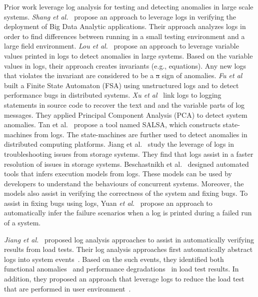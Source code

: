\documentclass[conference]{IEEEtran}
\providecommand{\DIFdel}[1]{{\protect\color{red}\sout{#1}}}                      %
\providecommand{\DIFdelbegin}{} %
\providecommand{\DIFdelend}{} %
\begin{document}
Prior work leverage log analysis for testing and detecting anomalies in large scale systems. \textsl{Shang et al.}~\cite{IanContextinformation} propose an approach to leverage logs in verifying the deployment of Big Data Analytic applications. Their approach analyzes logs in order to find differences between running in a small testing environment and a large field environment. \textsl{Lou et al.}~\cite{JGLouMining} propose an approach to leverage variable values printed in logs to detect anomalies in large systems. Based on the variable values in logs, their approach creates invariants (e.g., equations). Any new logs that violates the invariant are considered to be a \DIFdelbegin \DIFdel{a }\DIFdelend sign of anomalies. \textsl{Fu et al}~\cite{QFuanomaly} built a Finite State Automaton (FSA) using unstructured logs and to detect performance bugs in distributed systems. 
\textsl{Xu et al}~\cite{ConsoleLogs} link logs to logging statements in source code to recover the text and and the variable parts of log messages. They applied Principal Component Analysis (PCA) to detect system anomalies. Tan et al.~\cite{TanSalsa} propose a tool named SALSA, which constructs state-machines from logs. The state-machines are further used to detect anomalies in distributed computing platforms. Jiang et al.~\cite{Jiang:2009:UCP:1525908.1525912} study the leverage of logs in troubleshooting issues from storage systems. They find that logs assist in a faster resolution of issues in storage systems. Beschastnikh et al.~\cite{Beschastnikh:2011:LEI:2025113.2025151, Beschastnikh:2014:IMC:2568225.2568246} designed automated tools that infers execution models from logs. These models can be used by developers to understand the behaviours of concurrent systems. Moreover, the models also assist in verifying the correctness of the system and fixing bugs.
To assist in fixing bugs using logs, Yuan \emph{et al$.$}~\cite{Yuan:2010:SED:1736020.1736038} propose an approach to automatically infer the failure scenarios when a log is printed during a failed run of a system.


\textsl{Jiang et al.}~\cite{Jiang:2008:AAA:1400155.1400158,JiangICSM2008, JiangICSM2009,Jiang:2010:ICS:1850000.1850068} proposed log analysis approaches to assist in automatically verifying results from load tests. Their log analysis approaches first automatically abstract logs into system events~\cite{Jiang:2008:AAA:1400155.1400158}. Based on the such events, they identified both functional anomalies~\cite{JiangICSM2008} and performance degradations~\cite{JiangICSM2009} in load test results. In addition, they proposed an approach that leverage logs to reduce the load test that are performed in user environment~\cite{Jiang:2010:ICS:1850000.1850068}.
\end{document}
